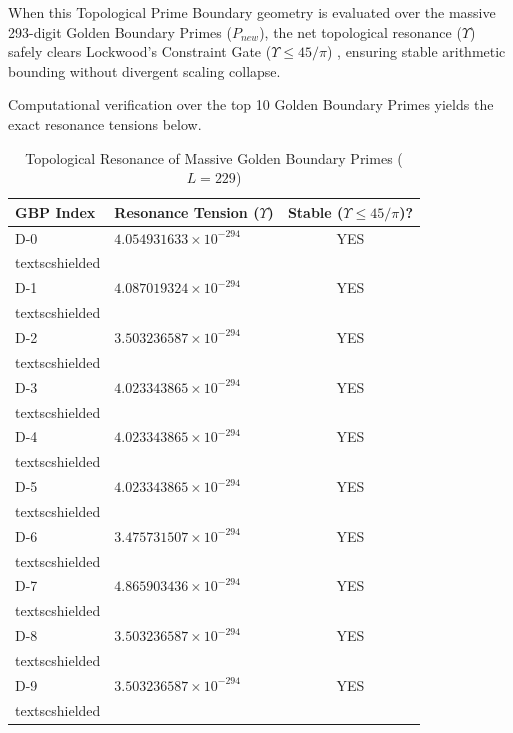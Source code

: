 When this Topological Prime Boundary geometry is evaluated over the massive 293-digit Golden Boundary Primes ($P_{new}$), the net topological resonance ($\Upsilon$) safely clears Lockwood's Constraint Gate ($\Upsilon \le 45/\pi$) \cite{lockwood_chrono}, ensuring stable arithmetic bounding without divergent scaling collapse.

Computational verification over the top 10 Golden Boundary Primes yields the exact resonance tensions below.

\begin{table}[h]
\centering
\caption{Topological Resonance of Massive Golden Boundary Primes ($L=229$)}
\label{tab:golden_bubble}
\begin{tabular}{@{}llc@{}}
\toprule
GBP Index & Resonance Tension ($\Upsilon$) & Stable ($\Upsilon \le 45/\pi$)? \\
\midrule
D-0 & $4.054931633 \times 10^{-294}$ & YES \\textsc{shielded} \\
D-1 & $4.087019324 \times 10^{-294}$ & YES \\textsc{shielded} \\
D-2 & $3.503236587 \times 10^{-294}$ & YES \\textsc{shielded} \\
D-3 & $4.023343865 \times 10^{-294}$ & YES \\textsc{shielded} \\
D-4 & $4.023343865 \times 10^{-294}$ & YES \\textsc{shielded} \\
D-5 & $4.023343865 \times 10^{-294}$ & YES \\textsc{shielded} \\
D-6 & $3.475731507 \times 10^{-294}$ & YES \\textsc{shielded} \\
D-7 & $4.865903436 \times 10^{-294}$ & YES \\textsc{shielded} \\
D-8 & $3.503236587 \times 10^{-294}$ & YES \\textsc{shielded} \\
D-9 & $3.503236587 \times 10^{-294}$ & YES \\textsc{shielded} \\
\bottomrule
\end{tabular}
\end{table}


